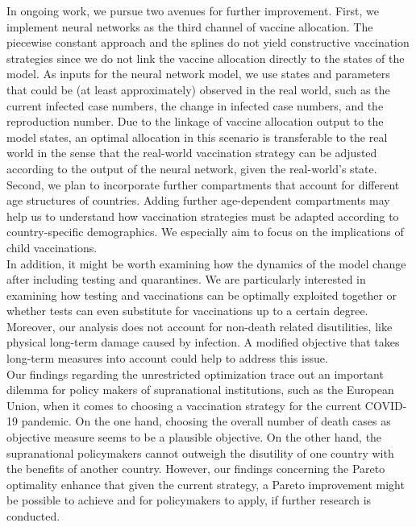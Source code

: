 In ongoing work, we pursue two avenues for further improvement. First, we implement neural networks as the third channel of vaccine allocation. The piecewise constant approach and the splines do not yield constructive vaccination strategies since we do not link the vaccine allocation directly to the states of the model. As inputs for the neural network model, we use states and parameters that could be (at least approximately) observed in the real world, such as the current infected case numbers, the change in infected case numbers, and the reproduction number. Due to the linkage of vaccine allocation output to the model states, an optimal allocation in this scenario is transferable to the real world in the sense that the real-world vaccination strategy can be adjusted according to the output of the neural network, given the real-world's state. Second, we plan to incorporate further compartments that account for different age structures of countries. Adding further age-dependent compartments may help us to understand how vaccination strategies must be adapted according to country-specific demographics. We especially aim to focus on the implications of child vaccinations.  \\




In addition, it might be worth examining how the dynamics of the model change after including testing and quarantines. We are particularly interested in examining how testing and vaccinations can be optimally exploited together or whether tests can even substitute for vaccinations up to a certain degree. Moreover, our analysis does not account for non-death related disutilities, like physical long-term damage caused by infection. A modified objective that takes long-term measures into account could help to address this issue. \\




Our findings regarding the unrestricted optimization trace out an important dilemma for policy makers of supranational institutions, such as the European Union, when it comes to choosing a vaccination strategy for the current COVID-19 pandemic. On the one hand, choosing the overall number of death cases as objective measure seems to be a plausible objective. On the other hand, the supranational policymakers cannot outweigh the disutility of one country with the benefits of another country. However, our findings concerning the Pareto optimality enhance that given the current strategy, a Pareto improvement might be possible to achieve and for policymakers to apply, if further research is conducted.


